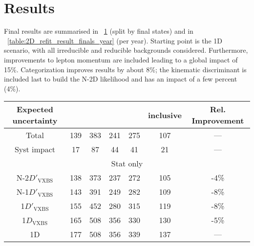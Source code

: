 \section{Results}
\label{sec:results}
Final results are summarised in \tablename~\ref{table:2D_refit_result_finals} (split by final states) and in \tablename~\ref{table:2D_refit_result_finals_year} (per year).
Starting point is the 1D scenario, with all irreducible and reducible backgrounds considered.
Furthermore, improvements to lepton momentum are included leading to a global impact of 15\%.
Categorization improves results by about 8\%;
the kinematic discriminant is included last to build the N-2D likelihood and has an impact of a few percent (4\%).
\begin{table}[ht]
\begin{center}
    \begin{tabular}{ccccccc}
    \hline			
    Expected uncertainty	&	\fourmu	&	\foure	&	\twoetwomu	&\twomutwoe	& inclusive & Rel. Improvement \\
    \hline			
    Total	&	139	&	383	&	241	&	275	&	107	&	---	\\
    \hline
    Syst impact	&	17	&	87	&	44	&	41	&	21	&	---	\\
    \hline
    \multicolumn{7}{c}{Stat only}\\
    \hline
        N-2$D'_\text{VXBS}$	&	138	&	373	&	237	&	272	&	105	&	-4\%	\\
        N-1$D'_\text{VXBS}$	&	143	&	391	&	249	&	282	&	109	&	-8\%	\\
        1$D'_\text{VXBS}$	&	155	&	452	&	280	&	315	&	119	&	-8\%	\\
        1$D_\text{VXBS}$	&	165	&	508	&	356	&	330	&	130	&	-5\%	\\
        1D	&	177	&	508	&	356	&	339	&	137	&	---	\\
    \hline			
    \end{tabular}
    \label{table:2D_refit_result_finals}
\end{center}
\end{table}

